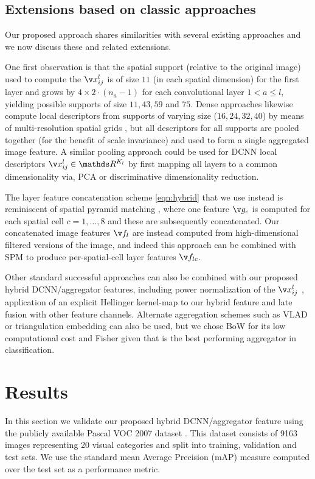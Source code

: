 \documentclass{article}
\begin{document}
\subsection{Extensions based on classic approaches}
Our proposed approach shares similarities with several existing approaches and we now discuss these and related extensions.

One first observation is that the spatial support (relative to the original image) used to compute the $\v x_{ij}^l$ is of size $11$ (in each spatial dimension) for the first layer and grows by $4 \times 2 \cdot (n_a-1)$ for each convolutional layer $ 1 < a \leq l$, yielding possible supports of size $11,43,59$ and $75$. Dense approaches likewise compute local descriptors from supports of varying size ($16,24,32,40$) by means of multi-resolution spatial grids \cite{Chatfield2011}, but all descriptors for all supports are pooled together (for the benefit of scale invariance) and used to form a single aggregated image feature. A similar pooling approach could be used for DCNN local descriptors $\v x_{ij}^l \in \mathds R^{K_l}$ by first mapping all layers to a common dimensionality via, \eg PCA or discriminative dimensionality reduction.

The layer feature concatenation scheme \eqref{eqn:hybrid} that we use instead is reminiscent of spatial pyramid matching \cite{Lazebnika,Bosch}, where one feature $\v g_{c}$ is computed for each spatial cell $c=1,\ldots,8$ and these are subsequently concatenated. Our concatenated image features $\v f_l$ are instead computed from high-dimensional filtered versions of the image, and indeed this approach can be combined with SPM to produce per-spatial-cell layer features $\v f_{lc}$.

Other standard successful approaches can also be combined with our proposed hybrid DCNN/aggregator features, including power normalization of the $\v x_{ij}^l$ \cite{Arandjelovic2012}, application of an explicit Hellinger kernel-map to our hybrid feature \cite{Chatfield2011} and late fusion with other feature channels.
Alternate aggregation schemes such as VLAD or triangulation embedding \cite{Delhumeau2013,Zisserman2014} can also be used, but we chose BoW for its low computational cost and Fisher given that is the best performing aggregator in classification.

\section{Results}\label{results}
In this section we validate our proposed hybrid DCNN/aggregator feature using the publicly available Pascal VOC 2007 dataset \cite{pascal2007}. This dataset consists of 9163 images representing 20 visual categories and split into training, validation and test sets. We use the standard mean Average Precision (mAP) measure computed over the test set as a performance metric.
\end{document}
